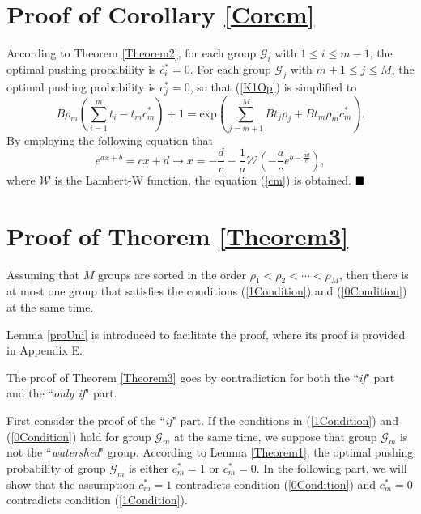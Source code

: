 \documentclass[12pt, draftclsnofoot, onecolumn]{IEEEtran}
\begin{document}
\section{Proof of Corollary \ref{Corcm}}
\setcounter{equation}{0}
\renewcommand{\theequation}{\thesection.\arabic{equation}}
According to Theorem \ref{Theorem2}, for each group $\mathcal{G}_{i}$ with $1\leq i \leq m-1$, the optimal pushing probability is $c_{i}^{\ast} =0$. For each group $\mathcal{G}_{j}$ with $m+1 \leq j \leq M$, the optimal pushing probability is $c_{j}^{\ast} =0$, so that (\ref{K1Op}) is simplified to
\begin{equation} \label{EquCm}
B \rho_m({\sum\limits_{i=1}^{m}t_i}-t_m c_m^{\ast}) + 1= \textrm{exp}\left({\sum\limits_{j=m+1}^{M} B t_j \rho_j + B t_m\rho_m c_m^{\ast}}\right).
\end{equation}
By employing the following equation that
\begin{equation}
e^{ax+b} = cx+d \to x = -\frac{d}{c}-\frac{1}{a}\mathcal{W}(-\frac{a}{c} e^{b-\frac{ad}{c}}),
\end{equation}
where $\mathcal{W}$ is the Lambert-W function, the equation (\ref{cm}) is obtained.
$\hfill\blacksquare$


\section{Proof of Theorem \ref{Theorem3}}
\setcounter{equation}{0}
\renewcommand{\theequation}{\thesection.\arabic{equation}}

\begin{lemma}\label{proUni}
Assuming that $M$ groups are sorted in the order $\rho_1 < \rho_2 <\cdots < \rho_M$,
then there is at most one group that satisfies the conditions  (\ref{1Condition}) and (\ref{0Condition}) at the same time.
\end{lemma}
Lemma \ref{proUni} is introduced to facilitate the proof, where its proof is provided in Appendix E.

The proof of Theorem \ref{Theorem3} goes by contradiction for both the ``\textit{if}" part and the ``\textit{only if}" part.

First consider the proof of the ``\textit{if}" part.
If the conditions in (\ref{1Condition}) and (\ref{0Condition}) hold for group $\mathcal{G}_m$ at the same time, we suppose that group $\mathcal{G}_m$ is not the ``\textit{watershed}"  group. According to Lemma \ref{Theorem1}, the optimal pushing probability of group $\mathcal{G}_m$ is either $c_m^{\ast}=1$ or $c_m^{\ast}=0$. In the following part, we will show that the assumption $c_m^{\ast}=1$ contradicts condition (\ref{0Condition}) and $c_m^{\ast}=0$ contradicts condition (\ref{1Condition}).
\end{document}
